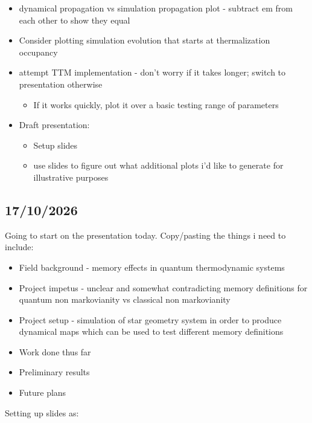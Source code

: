 \documentclass[
  letterpaper,
  DIV=11,
  numbers=noendperiod,
  oneside]{scrartcl}
\providecommand{\tightlist}{%
  \setlength{\itemsep}{0pt}\setlength{\parskip}{0pt}}
\begin{document}
\begin{itemize}
\tightlist
\item
  dynamical propagation vs simulation propagation plot - subtract em
  from each other to show they equal
\item
  Consider plotting simulation evolution that starts at thermalization
  occupancy
\item
  attempt TTM implementation - don't worry if it takes longer; switch to
  presentation otherwise

  \begin{itemize}
  \tightlist
  \item
    If it works quickly, plot it over a basic testing range of
    parameters
  \end{itemize}
\item
  Draft presentation:

  \begin{itemize}
  \tightlist
  \item
    Setup slides
  \item
    use slides to figure out what additional plots i'd like to generate
    for illustrative purposes
  \end{itemize}
\end{itemize}

\subsection{17/10/2026}\label{section-1}

Going to start on the presentation today. Copy/pasting the things i need
to include:

\begin{itemize}
\tightlist
\item
  Field background - memory effects in quantum thermodynamic systems
\item
  Project impetus - unclear and somewhat contradicting memory
  definitions for quantum non markovianity vs classical non markovianity
\item
  Project setup - simulation of star geometry system in order to produce
  dynamical maps which can be used to test different memory definitions
\item
  Work done thus far
\item
  Preliminary results
\item
  Future plans
\end{itemize}

Setting up slides as:
\end{document}
